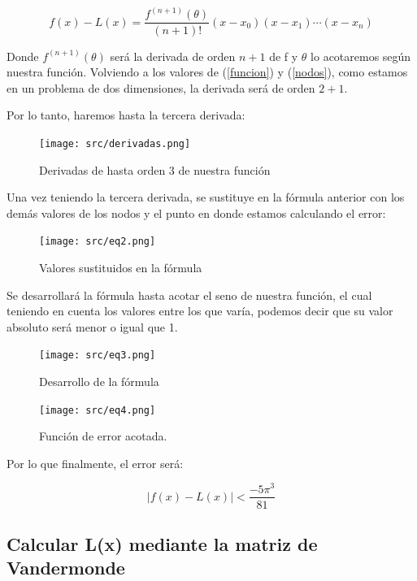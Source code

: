 \documentclass{article}
\begin{document}
\begin{equation}
	f(x) - L(x) = \frac{f^{(n+1)}(\theta)}{(n+1)!}(x - x_0)(x - x_1)\cdots(x - x_n)
\end{equation}

Donde $f^{(n+1)}(\theta)$ será la derivada de orden $n+1$ de f y $\theta$ lo acotaremos según nuestra función.
Volviendo a los valores de (\ref{funcion}) y (\ref{nodos}), como estamos en un problema de dos dimensiones, la derivada será de orden $2+1$.

Por lo tanto, haremos hasta la tercera derivada:

\begin{figure}[h]
	\center
	\texttt{[image: src/derivadas.png]}
	\caption{Derivadas de hasta orden 3 de nuestra función}
\end{figure}

Una vez teniendo la tercera derivada, se sustituye en la fórmula anterior con los demás valores de los nodos y el punto en donde estamos calculando el error:


\begin{figure}[h]
	\center
	\texttt{[image: src/eq2.png]}
	\caption{Valores sustituidos en la fórmula}
\end{figure}

\newpage

Se desarrollará la fórmula hasta acotar el seno de nuestra función, el cual teniendo en cuenta los valores entre los que varía, podemos decir que su valor absoluto será menor o igual que 1.

\begin{figure}[h]
	\center
	\texttt{[image: src/eq3.png]}
	\caption{Desarrollo de la fórmula}
\end{figure}

\begin{figure}[h]
	\center
	\texttt{[image: src/eq4.png]}
	\caption{Función de error acotada.}
\end{figure}

Por lo que finalmente, el error será:

\begin{equation}\label{funcion}
  \big|f(x) - L(x)\big| < \frac{-5 \pi^3}{81}
\end{equation}


\subsection{Calcular L(x) mediante la matriz de Vandermonde}
\end{document}
